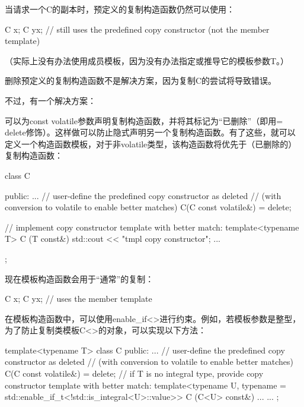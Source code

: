 当请求一个C的副本时，预定义的复制构造函数仍然可以使用：

\begin{cpp}
C x;
C y{x}; // still uses the predefined copy constructor (not the member template)
\end{cpp}

（实际上没有办法使用成员模板，因为没有办法指定或推导它的模板参数T。）

删除预定义的复制构造函数不是解决方案，因为复制C的尝试将导致错误。

不过，有一个解决方案：

可以为const volatile参数声明复制构造函数，并将其标记为“已删除”（即用= delete修饰）。这样做可以防止隐式声明另一个复制构造函数。有了这些，就可以定义一个构造函数模板，对于非volatile类型，该构造函数将优先于（已删除的）复制构造函数：

\begin{cpp}
class C
{
public:
	...
	// user-define the predefined copy constructor as deleted
	// (with conversion to volatile to enable better matches)
	C(C const volatile&) = delete;
	
	// implement copy constructor template with better match:
	template<typename T>
	C (T const&) {
		std::cout << "tmpl copy constructor\n";
	}
...
};
\end{cpp}

现在模板构造函数会用于“通常”的复制：

\begin{cpp}
C x;
C y{x}; // uses the member template
\end{cpp}

在模板构造函数中，可以使用enable\_if<>进行约束。例如，若模板参数是整型，为了防止复制类模板C<>的对象，可以实现以下方法：

\begin{cpp}
template<typename T>
class C
{
public:
	...
	// user-define the predefined copy constructor as deleted
	// (with conversion to volatile to enable better matches)
	C(C const volatile&) = delete;
	// if T is no integral type, provide copy constructor template with better match:
	template<typename U,
	typename = std::enable_if_t<!std::is_integral<U>::value>>
	C (C<U> const&) {
		...
	}
	...
};
\end{cpp}












